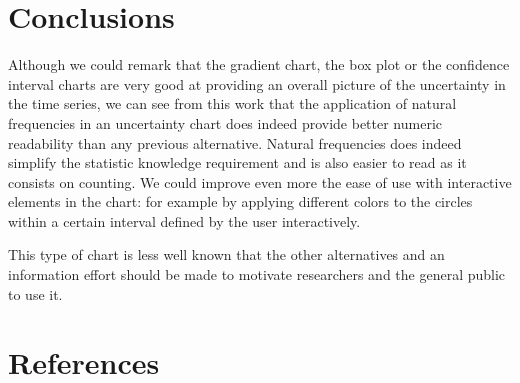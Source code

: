 \documentclass[a4paper,3p,sort&compress]{elsarticle}
\begin{document}
\section{Conclusions}
\label{sec:concl}

Although we could remark that the gradient chart, the box plot or the confidence interval charts are very good at 
providing an overall picture of the uncertainty in the time series, we can see from this work that the application of natural 
frequencies in an uncertainty chart does indeed
provide better numeric readability than any previous alternative. Natural frequencies does indeed simplify 
the statistic knowledge requirement and is also easier to read as it consists on counting.
We could improve even more the ease of use with interactive elements in the chart: for example
by applying different colors to the circles within a certain interval defined by the user interactively.

This type of chart is less well known that the other alternatives and an information effort should be made to motivate 
researchers and the general public to use it.

\section{References}
\label{sec:ref}



\end{document}
